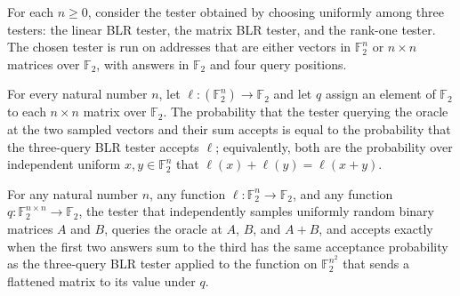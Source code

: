 \begin{definition}
\label{FABL.quadraticCharacterPairTester}
\leanok
{}
For each $n\ge 0$, consider the tester obtained by choosing uniformly among three
testers: the linear BLR tester, the matrix BLR tester, and the rank-one tester. The
chosen tester is run on addresses that are either vectors in $\mathbb F_2^n$ or $n\times
n$ matrices over $\mathbb F_2$, with answers in $\mathbb F_2$ and four query positions.
\end{definition}

\begin{theorem}
\label{FABL.quadraticPairLinearBLRTester_acceptanceProbability}
\leanok
{}
For every natural number $n$, let $\ell:(\mathbb{F}_2^n)\to\mathbb{F}_2$ and let $q$
assign an element of $\mathbb{F}_2$ to each $n\times n$ matrix over $\mathbb{F}_2$. The
probability that the tester querying the oracle at the two sampled vectors and their sum
accepts is equal to the probability that the three-query BLR tester accepts $\ell$;
equivalently, both are the probability over independent uniform $x,y\in\mathbb{F}_2^n$
that $\ell(x)+\ell(y)=\ell(x+y)$.
\end{theorem}

\begin{theorem}
\label{FABL.quadraticPairMatrixBLRTester_acceptanceProbability}
\leanok
{}
For any natural number $n$, any function $\ell:\mathbb{F}_2^n\to\mathbb{F}_2$, and any
function $q:\mathbb{F}_2^{n\times n}\to\mathbb{F}_2$, the tester that independently
samples uniformly random binary matrices $A$ and $B$, queries the oracle at $A$, $B$,
and $A+B$, and accepts exactly when the first two answers sum to the third has the same
acceptance probability as the three-query BLR tester applied to the function on
$\mathbb{F}_2^{n^2}$ that sends a flattened matrix to its value under $q$.
\end{theorem}


